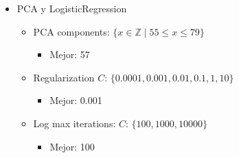 \documentclass[journal]{IEEEtran}
\begin{document}
\begin{otherlanguage}{english}
\begin{itemize}
        \item PCA y LogisticRegression
        \begin{itemize}
                \item PCA components: \( \{ x \in \mathbb{Z} \mid 55 \leq x \leq 79 \} \)
                \begin{itemize}
                        \item Mejor: 57
                \end{itemize}
                \item Regularization \( C \): \( \{ 0.0001, 0.001, 0.01, 0.1, 1, 10 \} \)
                \begin{itemize}
                        \item Mejor: 0.001
                \end{itemize}
                \item Log max iterations: \( C \): \( \{ 100, 1000, 10000 \} \)
                \begin{itemize}
                        \item Mejor: 100
                \end{itemize}
        \end{itemize}


\end{itemize}
\end{otherlanguage}
\end{document}
